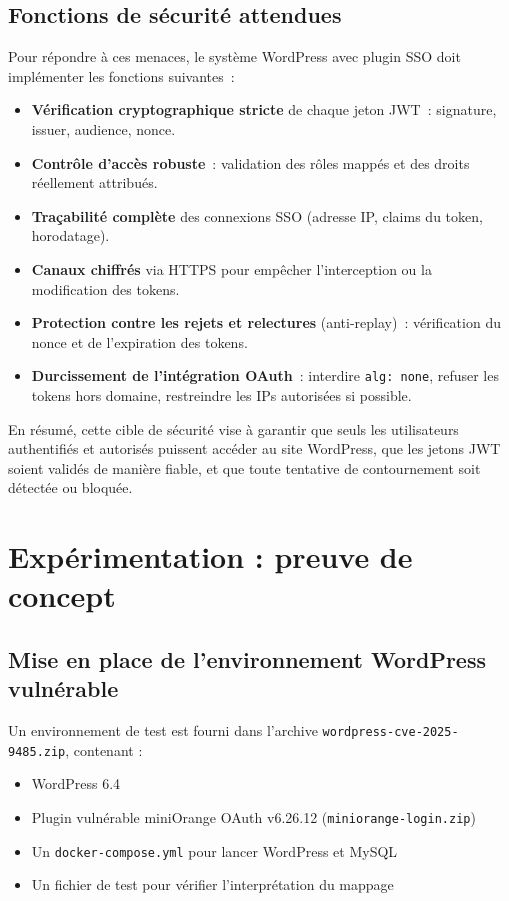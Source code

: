 \documentclass[a4paper,12pt]{article}
\begin{document}
\subsection*{Fonctions de sécurité attendues}
Pour répondre à ces menaces, le système WordPress avec plugin SSO doit implémenter les fonctions suivantes~:
\begin{itemize}
  \item \textbf{Vérification cryptographique stricte} de chaque jeton JWT~: signature, issuer, audience, nonce.
  \item \textbf{Contrôle d’accès robuste}~: validation des rôles mappés et des droits réellement attribués.
  \item \textbf{Traçabilité complète} des connexions SSO (adresse IP, claims du token, horodatage).
  \item \textbf{Canaux chiffrés} via HTTPS pour empêcher l’interception ou la modification des tokens.
  \item \textbf{Protection contre les rejets et relectures} (anti-replay)~: vérification du nonce et de l’expiration des tokens.
  \item \textbf{Durcissement de l’intégration OAuth}~: interdire \texttt{alg: none}, refuser les tokens hors domaine, restreindre les IPs autorisées si possible.
\end{itemize}

En résumé, cette cible de sécurité vise à garantir que seuls les utilisateurs authentifiés et autorisés puissent accéder au site WordPress, que les jetons JWT soient validés de manière fiable, et que toute tentative de contournement soit détectée ou bloquée.

\section{Expérimentation : preuve de concept}

\subsection{Mise en place de l’environnement WordPress vulnérable}

Un environnement de test est fourni dans l’archive \texttt{wordpress-cve-2025-9485.zip}, contenant :
\begin{itemize}
  \item WordPress 6.4
  \item Plugin vulnérable miniOrange OAuth v6.26.12 (\texttt{miniorange-login.zip})
  \item Un \texttt{docker-compose.yml} pour lancer WordPress et MySQL
  \item Un fichier de test pour vérifier l'interprétation du mappage
\end{itemize}
\end{document}
